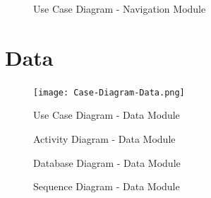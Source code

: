\documentclass[english]{article}
\begin{document}
        \begin{figure}[H]
            \centering	            
            \centerline{}
            \caption{Use Case Diagram - Navigation Module}
        \end{figure}
            
    \section{Data}
        \begin{figure}[H]
            \centering	            
            \centerline{\texttt{[image: Case-Diagram-Data.png]}}
            \caption{Use Case Diagram - Data Module}
        \end{figure} 
        
        \begin{figure}[H]
            \centering	            
            \centerline{}
            \caption{Activity Diagram - Data Module}
        \end{figure} 
        
        \begin{figure}[H]
            \centering	            
            \centerline{}
            \caption{Database Diagram - Data Module}
        \end{figure} 
        
        \begin{figure}[H]
            \centering	            
            \centerline{}
            \caption{Sequence Diagram - Data Module}
        \end{figure} 
        
\end{document}
